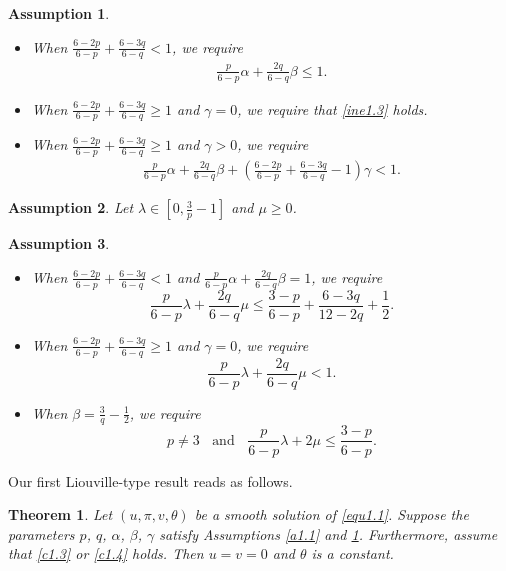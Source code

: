 \documentclass[11pt,reqno]{amsart}
\newtheorem{Thm}{Theorem}[section]
\newtheorem{Assum}{Assumption}[section]
\numberwithin{Thm}{section}
\begin{document}
\begin{Assum}\label{a1.2}
\begin{itemize}
\item[(i)] When $\frac{6-2p}{6-p} + \frac{6-3q}{6-q} < 1$, we require
\begin{align}\label{ine1.3}
\frac{p}{6-p}\alpha+\frac{2q}{6-q}\beta\leq1.
\end{align}
\item[(ii)] When $\frac{6-2p}{6-p} + \frac{6-3q}{6-q} \geq 1$ and $\gamma=0$, we require that \eqref{ine1.3} holds.
\item[(iii)] When $\frac{6-2p}{6-p} + \frac{6-3q}{6-q} \geq 1$ and $\gamma>0$, we require
 \begin{align}\label{ine1.6}
 \frac{p}{6-p}\alpha+\frac{2q}{6-q}\beta+\left(\frac{6-2p}{6-p}+\frac{6-3q}{6-q}-1\right)\gamma<1.
 \end{align}
\end{itemize}
\end{Assum}


\begin{Assum}\label{a1.3}
Let $\lambda\in\left[0,\frac{3}{p}-1\right]$ and $\mu\geq0$.
\end{Assum}

\begin{Assum}\label{a1.4}
\begin{itemize}
\item[(i)]
When $\frac{6-2p}{6-p} + \frac{6-3q}{6-q} < 1$ and $\frac{p}{6-p}\alpha+\frac{2q}{6-q}\beta=1$, we require
$$
\frac{p}{6-p}\lambda+\frac{2q}{6-q}\mu\leq \frac{3-p}{6-p}+\frac{6-3q}{12-2q}+\frac{1}{2}.
$$	
\item[(ii)] When $\frac{6-2p}{6-p} + \frac{6-3q}{6-q} \geq 1$ and $\gamma=0$,
we require
$$
\frac{p}{6-p}\lambda+\frac{2q}{6-q}\mu<1.
$$	
\item[(iii)] When $\beta=\frac{3}{q}-\frac{1}{2}$, we require
$$
p\neq3\;\;\text{ and }\;\;\frac{p}{6-p}\lambda+2\mu\leq \frac{3-p}{6-p}.
$$
\end{itemize}	
\end{Assum}

Our first Liouville-type result reads as follows.
\begin{Thm}\label{main1}
Let $(u,\pi,v,\theta)$ be a smooth solution of \eqref{equ1.1}. Suppose the parameters $p$, $q$, $\alpha$, $\beta$, $\gamma$ satisfy Assumptions \ref{a1.1} and \ref{a1.2}. Furthermore, assume that  \eqref{c1.3} or  \eqref{c1.4} holds.
Then $u=v=0$ and $\theta$ is a constant.
\end{Thm}
\end{document}
